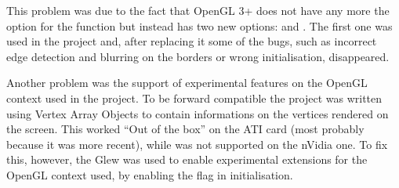This problem was due to the fact that OpenGL 3+ does not have any more the 
option for the  function but instead has two new options:
 and . The first one was
used in the project and, after replacing it some of the bugs, such as incorrect
edge detection and blurring on the borders or wrong initialisation, disappeared.

Another problem was the support of experimental features on the OpenGL context used
in the project. To be forward compatible the project was written using Vertex
Array Objects to contain informations on the vertices rendered on the screen.
This worked ``Out of the box'' on the ATI card (most probably because it was
more recent), while was not supported on the nVidia one. To fix this, however,
the Glew was used to enable experimental extensions for the OpenGL context used,
by enabling the  flag in initialisation.	
